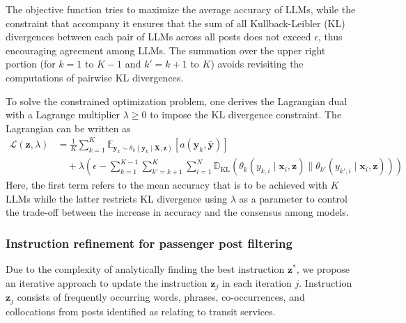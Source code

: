 \documentclass[a4paper,fleqn,12pt]{cas-sc}
\begin{document}
The objective function tries to maximize the average accuracy of LLMs, while the constraint that accompany it ensures that the sum of all Kullback-Leibler (KL) divergences between each pair of LLMs across all posts does not exceed \(\epsilon\), thus encouraging agreement among LLMs. The summation over the upper right portion (for \(k=1\) to \(K-1\) and \(k'=k+1\) to \(K\)) avoids revisiting the computations of pairwise KL divergences.

To solve the constrained optimization problem, one derives the Lagrangian dual with a Lagrange multiplier \(\lambda \geq 0\) to impose the KL divergence constraint. The Lagrangian can be written as
\begin{equation}
\begin{aligned}
\mathcal{L}(\boldsymbol{z}, \lambda) &= \frac{1}{K} \sum_{k=1}^{K} \mathbb{E}_{\boldsymbol{y}_{k} \sim \theta_{k}(\boldsymbol{y}_{k} \mid \boldsymbol{X}, \boldsymbol{z})} \left[ a(\boldsymbol{y}_{k}, \boldsymbol{\bar{y}}) \right] \\
&\quad + \lambda \left( \epsilon - \sum_{k=1}^{K-1} \sum_{k'=k+1}^{K} \sum_{i=1}^{N} \mathbb{D}_{\text{KL}} \left( \theta_{k}(y_{k,i} \mid \boldsymbol{x}_i, \boldsymbol{z}) \parallel \theta_{k'}(y_{k',i} \mid \boldsymbol{x}_i, \boldsymbol{z}) \right) \right)
\end{aligned}
\end{equation}
Here, the first term refers to the mean accuracy that is to be achieved with \(K\) LLMs while the latter restricts KL divergence using \(\lambda\) as a parameter to control the trade-off between the increase in accuracy and the consensus among models.

\subsubsection{Instruction refinement for passenger post filtering}

Due to the complexity of analytically finding the best instruction \( \boldsymbol{z}^{*} \), we propose an iterative approach to update the instruction \( \boldsymbol{z}_j \) in each iteration \( j \). Instruction \( \boldsymbol{z}_j \) consists of frequently occurring words, phrases, co-occurrences, and collocations from posts identified as relating to transit services. 
\end{document}
